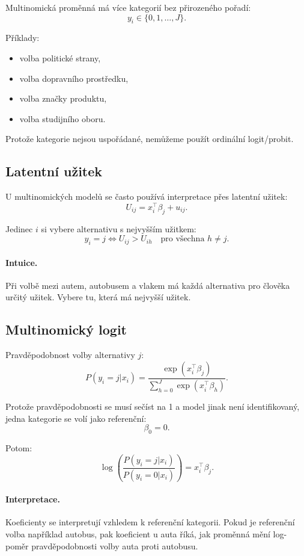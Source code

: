 Multinomická proměnná má více kategorií bez přirozeného pořadí:
\[
y_i\in\{0,1,\ldots,J\}.
\]

Příklady:
\begin{itemize}
    \item volba politické strany,
    \item volba dopravního prostředku,
    \item volba značky produktu,
    \item volba studijního oboru.
\end{itemize}

Protože kategorie nejsou uspořádané, nemůžeme použít ordinální logit/probit.

\subsection{Latentní užitek}

U multinomických modelů se často používá interpretace přes latentní užitek:
\[
U_{ij}=x_i^\top\beta_j+u_{ij}.
\]

Jedinec $i$ si vybere alternativu s nejvyšším užitkem:
\[
y_i=j
\iff
U_{ij}>U_{ih}
\quad
\text{pro všechna } h\neq j.
\]

\paragraph{Intuice.}
Při volbě mezi autem, autobusem a vlakem má každá alternativa pro člověka určitý užitek. Vybere tu, která
má nejvyšší užitek.

\subsection{Multinomický logit}

Pravděpodobnost volby alternativy $j$:
\[
P(y_i=j|x_i)
=
\frac{\exp(x_i^\top\beta_j)}
{\sum_{h=0}^{J}\exp(x_i^\top\beta_h)}.
\]

Protože pravděpodobnosti se musí sečíst na 1 a model jinak není identifikovaný, jedna kategorie se volí
jako referenční:
\[
\beta_0=0.
\]

Potom:
\[
\log\left(
\frac{P(y_i=j|x_i)}
{P(y_i=0|x_i)}
\right)
=
x_i^\top\beta_j.
\]

\paragraph{Interpretace.}
Koeficienty se interpretují vzhledem k referenční kategorii. Pokud je referenční volba například autobus,
pak koeficient u auta říká, jak proměnná mění log-poměr pravděpodobnosti volby auta proti autobusu.

